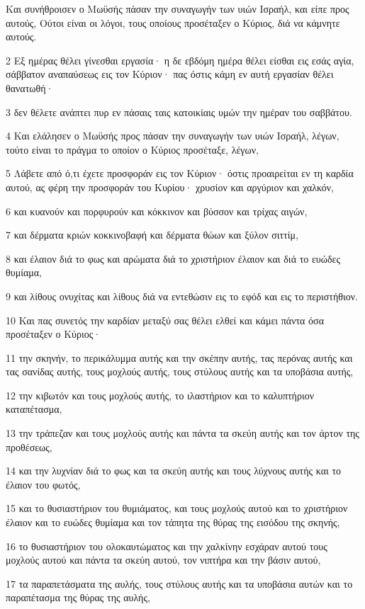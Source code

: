 \par Και συνήθροισεν ο Μωϋσής πάσαν την συναγωγήν των υιών Ισραήλ, και είπε προς αυτούς, Ούτοι είναι οι λόγοι, τους οποίους προσέταξεν ο Κύριος, διά να κάμνητε αυτούς.
\par 2 Εξ ημέρας θέλει γίνεσθαι εργασία· η δε εβδόμη ημέρα θέλει είσθαι εις εσάς αγία, σάββατον αναπαύσεως εις τον Κύριον· πας όστις κάμη εν αυτή εργασίαν θέλει θανατωθή·
\par 3 δεν θέλετε ανάπτει πυρ εν πάσαις ταις κατοικίαις υμών την ημέραν του σαββάτου.
\par 4 Και ελάλησεν ο Μωϋσής προς πάσαν την συναγωγήν των υιών Ισραήλ, λέγων, τούτο είναι το πράγμα το οποίον ο Κύριος προσέταξε, λέγων,
\par 5 Λάβετε από ό,τι έχετε προσφοράν εις τον Κύριον· όστις προαιρείται εν τη καρδία αυτού, ας φέρη την προσφοράν του Κυρίου· χρυσίον και αργύριον και χαλκόν,
\par 6 και κυανούν και πορφυρούν και κόκκινον και βύσσον και τρίχας αιγών,
\par 7 και δέρματα κριών κοκκινοβαφή και δέρματα θώων και ξύλον σιττίμ,
\par 8 και έλαιον διά το φως και αρώματα διά το χριστήριον έλαιον και διά το ευώδες θυμίαμα,
\par 9 και λίθους ονυχίτας και λίθους διά να εντεθώσιν εις το εφόδ και εις το περιστήθιον.
\par 10 Και πας συνετός την καρδίαν μεταξύ σας θέλει ελθεί και κάμει πάντα όσα προσέταξεν ο Κύριος·
\par 11 την σκηνήν, το περικάλυμμα αυτής και την σκέπην αυτής, τας περόνας αυτής και τας σανίδας αυτής, τους μοχλούς αυτής, τους στύλους αυτής και τα υποβάσια αυτής,
\par 12 την κιβωτόν και τους μοχλούς αυτής, το ιλαστήριον και το καλυπτήριον καταπέτασμα,
\par 13 την τράπεζαν και τους μοχλούς αυτής και πάντα τα σκεύη αυτής και τον άρτον της προθέσεως,
\par 14 και την λυχνίαν διά το φως και τα σκεύη αυτής και τους λύχνους αυτής και το έλαιον του φωτός,
\par 15 και το θυσιαστήριον του θυμιάματος, και τους μοχλούς αυτού και το χριστήριον έλαιον και το ευώδες θυμίαμα και τον τάπητα της θύρας της εισόδου της σκηνής,
\par 16 το θυσιαστήριον του ολοκαυτώματος και την χαλκίνην εσχάραν αυτού τους μοχλούς αυτού και πάντα τα σκεύη αυτού, τον νιπτήρα και την βάσιν αυτού,
\par 17 τα παραπετάσματα της αυλής, τους στύλους αυτής και τα υποβάσια αυτών και το παραπέτασμα της θύρας της αυλής,
